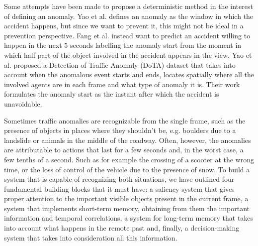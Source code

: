 Some attempts have been made to propose a deterministic method in the interest of defining an anomaly.
Yao et al. \cite{yao2019unsupervised} defines an anomaly as the window in which the accident happens, but since we want to prevent it, this might not be ideal in a prevention perspective. 
Fang et al. \cite{fang2019dada} instead want to predict an accident willing to happen in the next 5 seconds labelling the anomaly start from the moment in which half part of the object involved in the accident appears in the view.
Yao et al. \cite{yao2020when} proposed a Detection of Traffic Anomaly (DoTA) dataset that takes into account when the anomalous event starts and ends, locates spatially where all the involved agents are in each frame and what type of anomaly it is.
Their work formulates the anomaly start as the instant after which the accident is unavoidable.

Sometimes traffic anomalies are recognizable from the single frame, such as the presence of objects in places where they shouldn't be, e.g. boulders due to a landslide or animals in the middle of the roadway.
Often, however, the anomalies are attributable to actions that last for a few seconds and, in the worst case, a few tenths of a second.
Such as for example the crossing of a scooter at the wrong time, or the loss of control of the vehicle due to the presence of snow.
To build a system that is capable of recognizing both situations, we have outlined four fundamental building blocks that it must have: a saliency system that gives proper attention to the important visible objects present in the current frame, a system that implements short-term memory, obtaining from them the important information and temporal correlations, a system for long-term memory that takes into account what happens in the remote past and, finally, a decision-making system that takes into consideration all this information.

